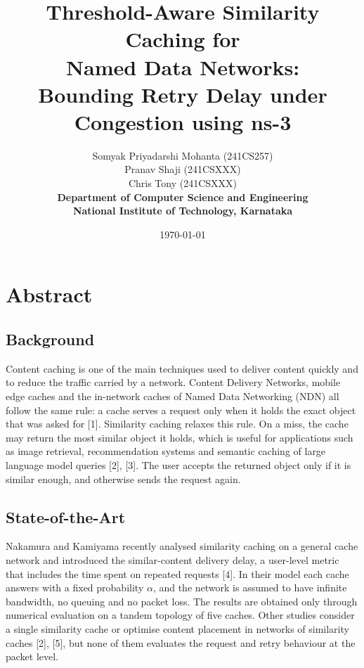 \documentclass[12pt,a4paper]{article}
\title{\textbf{Threshold-Aware Similarity Caching for\\
Named Data Networks:\\
Bounding Retry Delay under Congestion using ns-3}}
\author{Somyak Priyadarshi Mohanta (241CS257)\\
Pranav Shaji (241CSXXX)\\
Chris Tony (241CSXXX)\\
\textbf{Department of Computer Science and Engineering}\\
\textbf{National Institute of Technology, Karnataka}}
\date{\today}
\begin{document}
\maketitle

\section*{Abstract}

\subsection*{Background}
Content caching is one of the main techniques used to deliver content quickly and to reduce the
traffic carried by a network. Content Delivery Networks, mobile edge caches and the in-network
caches of Named Data Networking (NDN) all follow the same rule: a cache serves a request only when
it holds the exact object that was asked for [1]. Similarity caching relaxes this rule. On a miss,
the cache may return the most similar object it holds, which is useful for applications such as
image retrieval, recommendation systems and semantic caching of large language model queries
[2], [3]. The user accepts the returned object only if it is similar enough, and otherwise sends
the request again.

\subsection*{State-of-the-Art}
Nakamura and Kamiyama recently analysed similarity caching on a general cache network and
introduced the similar-content delivery delay, a user-level metric that includes the time spent on
repeated requests [4]. In their model each cache answers with a fixed probability $\alpha$, and the
network is assumed to have infinite bandwidth, no queuing and no packet loss. The results are
obtained only through numerical evaluation on a tandem topology of five caches. Other studies
consider a single similarity cache or optimise content placement in networks of similarity caches
[2], [5], but none of them evaluates the request and retry behaviour at the packet level.
\end{document}

